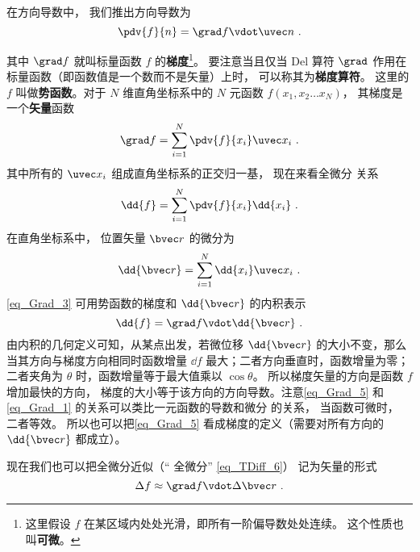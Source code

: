 

在方向导数中， 我们推出方向导数为
\begin{equation}\label{eq_Grad_1}
\pdv{f}{n} = \grad f \vdot \uvec n~.
\end{equation}

其中 $\grad f$ 就叫标量函数 $f$ 的\textbf{梯度}\footnote{这里假设 $f$ 在某区域内处处光滑，即所有一阶偏导数处处连续。 这个性质也叫\textbf{可微}。}。 要注意当且仅当 Del 算符 $\grad$ 作用在标量函数（即函数值是一个数而不是矢量）上时， 可以称其为\textbf{梯度算符}。 这里的 $f$ 叫做\textbf{势函数}。对于 $N$ 维直角坐标系中的 $N$ 元函数 $f(x_1,x_2\dots x_N)$， 其梯度是一个\textbf{矢量}函数
\begin{equation}
\grad f = \sum_{i=1}^{N}\pdv{f}{x_i}\uvec x_i~.
\end{equation}
其中所有的 $\uvec x_i$ 组成直角坐标系的正交归一基， 现在来看全微分 关系
\begin{equation}\label{eq_Grad_3}
\dd{f} = \sum_{i = 1}^N \pdv{f}{x_i} \dd{x_i}~.
\end{equation}
在直角坐标系中， 位置矢量 $\bvec r$ 的微分为
\begin{equation}
\dd{\bvec r} = \sum_{i=1}^{N} \dd{x_i} \uvec x_i~.
\end{equation}
\autoref{eq_Grad_3} 可用势函数的梯度和 $\dd{\bvec r}$ 的内积表示
\begin{equation}\label{eq_Grad_5}
\dd{f} = \grad f \vdot \dd{\bvec r}~.
\end{equation}
由内积的几何定义可知，从某点出发，若微位移 $\dd{\bvec r}$ 的大小不变，那么当其方向与梯度方向相同时函数增量 $\dd{f}$ 最大；二者方向垂直时，函数增量为零；二者夹角为 $\theta$ 时，函数增量等于最大值乘以 $\cos \theta$。 所以梯度矢量的方向是函数 $f$ 增加最快的方向， 梯度的大小等于该方向的方向导数。注意\autoref{eq_Grad_5} 和\autoref{eq_Grad_1} 的关系可以类比一元函数的导数和微分 的关系， 当函数可微时， 二者等效。 所以也可以把\autoref{eq_Grad_5} 看成梯度的定义（需要对所有方向的 $\dd{\bvec r}$ 都成立）。

现在我们也可以把全微分近似（“ 全微分” \autoref{eq_TDiff_6}） 记为矢量的形式
\begin{equation}\label{eq_Grad_6}
\Delta f \approx \grad f \vdot \Delta \bvec r~.
\end{equation}

